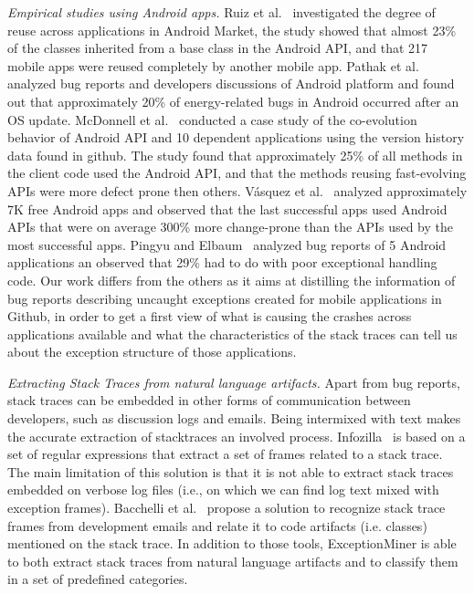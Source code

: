 \documentclass[conference]{IEEEtran}
\begin{document}
\textit{Empirical studies using Android apps.} Ruiz et al.~\cite{Ruiz12}
investigated the degree of reuse across applications in Android Market, the
study showed that almost 23\% of the classes inherited from a base class in the
Android API, and that 217 mobile apps were reused completely by another mobile
app. Pathak et al.~\cite{Patha11} analyzed bug reports and developers
discussions of Android platform and found out that approximately 20\% of
energy-related bugs in Android occurred after an OS update. McDonnell et
al.~\cite{McDon13} conducted a case study of the co-evolution behavior of
Android API and 10 dependent applications using the version history data found
in github. The study found that approximately 25\% of all methods in the client
code used the Android API, and that the methods reusing fast-evolving APIs were
more defect prone then others. Vásquez et al.~\cite{Linar13} analyzed
approximately 7K free Android apps and observed that the last successful apps
used Android APIs that were on average 300\% more change-prone than the APIs
used by the most successful apps. Pingyu and Elbaum~\cite{Zhang12} analyzed bug
reports of 5 Android applications an observed that 29\% had to do with poor
exceptional handling code. Our work differs from the others as it aims at
distilling the information of bug reports describing uncaught exceptions created
for mobile applications in Github, in order to get a first view
of what is causing the crashes across applications available and what the
characteristics of the stack traces can tell us about the exception structure of
those applications.

\textit{Extracting Stack Traces from natural language artifacts.} 
Apart from bug reports, stack traces can be embedded in other forms of
communication between developers, such as discussion logs and emails.
Being intermixed with text makes the accurate extraction of stacktraces 
an involved process.
Infozilla~\cite{bettenburg2008extracting}
is based on a set of regular expressions that extract a set of frames
related to a stack trace. The main limitation of this solution is that it is not
able to extract stack traces embedded on verbose log files (i.e., on which we
can find log text mixed with exception frames). Bacchelli
et al.~\cite{bacchelli2012content} propose a solution to recognize stack trace frames
from development emails and relate it to code artifacts (i.e. classes) mentioned
on the stack trace. In addition to those tools, ExceptionMiner is able to 
both extract stack traces from natural language artifacts and to 
classify them in a set of predefined categories.
\end{document}
